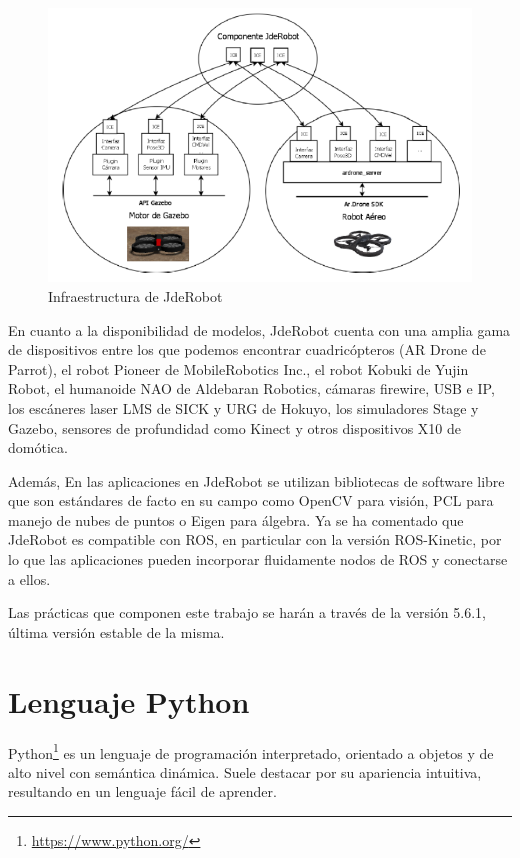 \begin{figure}[H]
  \begin{center}
    \includegraphics[width=0.99\linewidth]{figures/infraestructura.png}
		\caption{Infraestructura de JdeRobot}
		\label{fig.infraestructura}
		\end{center}
\end{figure}

En cuanto a la disponibilidad de modelos, JdeRobot cuenta con una amplia gama de dispositivos entre los que podemos encontrar cuadricópteros (AR Drone de Parrot), el robot Pioneer de MobileRobotics Inc., el robot Kobuki de Yujin Robot, el humanoide NAO de Aldebaran Robotics, cámaras firewire, USB e IP, los escáneres laser LMS de SICK y URG de Hokuyo, los simuladores Stage y Gazebo, sensores de profundidad como Kinect y otros dispositivos X10 de domótica. 

Además, En las aplicaciones en JdeRobot se utilizan bibliotecas de software libre que son estándares de facto en su campo como OpenCV para visión, PCL para manejo de nubes de puntos o Eigen para álgebra. Ya se ha comentado que JdeRobot es compatible con ROS, en particular con la versión ROS-Kinetic, por lo que las aplicaciones pueden incorporar fluidamente nodos de ROS y conectarse a ellos.

Las prácticas que componen este trabajo se harán a través de la versión 5.6.1, última versión estable de la misma.

\section{Lenguaje Python}
Python\footnote{\url{https://www.python.org/}} es un lenguaje de programación interpretado, orientado a objetos y de alto nivel con semántica dinámica. Suele destacar por su apariencia intuitiva, resultando en un lenguaje fácil de aprender. 

